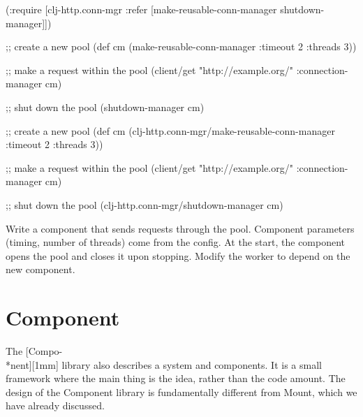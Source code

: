 \ifnarrow

\begin{english}
  \begin{clojure}
(:require
 [clj-http.conn-mgr :refer
   [make-reusable-conn-manager
    shutdown-manager]])

;; create a new pool
(def cm (make-reusable-conn-manager
         {:timeout 2 :threads 3}))

;; make a request within the pool
(client/get "http://example.org/"
            {:connection-manager cm})

;; shut down the pool
(shutdown-manager cm)
  \end{clojure}
\end{english}

\else

\begin{english}
  \begin{clojure}
;; create a new pool
(def cm (clj-http.conn-mgr/make-reusable-conn-manager
         {:timeout 2 :threads 3}))

;; make a request within the pool
(client/get "http://example.org/"
            {:connection-manager cm})

;; shut down the pool
(clj-http.conn-mgr/shutdown-manager cm)
  \end{clojure}
\end{english}

\fi


Write a component that sends requests through the pool. Component parameters (timing, number of threads) come from the config. At the start, the component opens the pool and closes it upon stopping. Modify the worker to depend on the new component.

\section{Component}


The [Compo-\\*nent][1mm] library also describes a system and components. It is a small framework where the main thing is the idea, rather than the code amount. The design of the Component library is fundamentally different from Mount, which we have already discussed.


